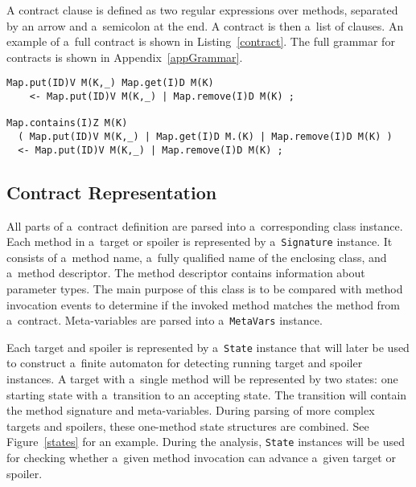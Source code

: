 A contract clause is defined as two regular expressions over methods, separated
by an arrow and a~semicolon at the end. A contract is then a~list of clauses. An
example of a~full contract is shown in Listing~\ref{contract}. The full grammar
for contracts is shown in Appendix~\ref{appGrammar}.

\begin{lstlisting}[label=contract, float, caption={Contract from
Chapter~\ref{chThree} written for a~Map with \texttt{int} keys and
\texttt{double} values. The first target matches an inserting element to the map
at a~given key and then retrieving it. The target can be invalidated by calling
either \texttt{put} or \texttt{get} with the same key. The second target matches
checking if a~key is present in the map and then modifying the value at the
given key. The target can be invalidated by replacing the value or by removing
it.}]
Map.put(ID)V M(K,_) Map.get(I)D M(K)
    <- Map.put(ID)V M(K,_) | Map.remove(I)D M(K) ;

Map.contains(I)Z M(K)
  ( Map.put(ID)V M(K,_) | Map.get(I)D M.(K) | Map.remove(I)D M(K) )
  <- Map.put(ID)V M(K,_) | Map.remove(I)D M(K) ;
\end{lstlisting}

\subsection{Contract Representation}
All parts of a~contract definition are parsed into a~corresponding class
instance. Each method in a~target or spoiler is represented by
a~\texttt{Signature} instance. It consists of a~method name, a~fully qualified
name of the enclosing class, and a~method descriptor. The method descriptor
contains information about parameter types. The main purpose of this class is to
be compared with method invocation events to determine if the invoked method
matches the method from a~contract. Meta-variables are parsed into
a~\texttt{MetaVars} instance.

Each target and spoiler is represented by a~\texttt{State} instance that will
later be used to construct a~finite automaton for detecting running target and
spoiler instances. A target with a~single method will be represented by two
states: one starting state with a~transition to an accepting state. The
transition will contain the method signature and meta-variables. During parsing
of more complex targets and spoilers, these one-method state structures are
combined. See Figure~\ref{states} for an example. During the analysis,
\texttt{State} instances will be used for checking whether a~given method
invocation can advance a~given target or spoiler.

